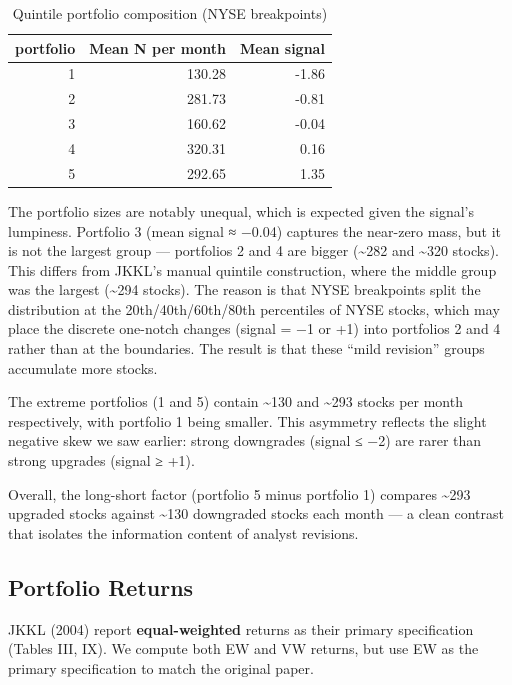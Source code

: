 \documentclass[
  letterpaper,
  DIV=11,
  numbers=noendperiod]{scrartcl}
\begin{document}
\begin{longtable}[t]{rrr}
\caption{\label{tab:portfolio-diagnostics}Quintile portfolio composition (NYSE breakpoints)}\\
\toprule
portfolio & Mean N per month & Mean signal\\
\midrule
1 & 130.28 & -1.86\\
2 & 281.73 & -0.81\\
3 & 160.62 & -0.04\\
4 & 320.31 & 0.16\\
5 & 292.65 & 1.35\\
\bottomrule
\end{longtable}

The portfolio sizes are notably unequal, which is expected given the
signal's lumpiness. Portfolio 3 (mean signal ≈ −0.04) captures the
near-zero mass, but it is not the largest group --- portfolios 2 and 4
are bigger (\textasciitilde282 and \textasciitilde320 stocks). This
differs from JKKL's manual quintile construction, where the middle group
was the largest (\textasciitilde294 stocks). The reason is that NYSE
breakpoints split the distribution at the 20th/40th/60th/80th
percentiles of NYSE stocks, which may place the discrete one-notch
changes (signal = −1 or +1) into portfolios 2 and 4 rather than at the
boundaries. The result is that these ``mild revision'' groups accumulate
more stocks.

The extreme portfolios (1 and 5) contain \textasciitilde130 and
\textasciitilde293 stocks per month respectively, with portfolio 1 being
smaller. This asymmetry reflects the slight negative skew we saw
earlier: strong downgrades (signal ≤ −2) are rarer than strong upgrades
(signal ≥ +1).

Overall, the long-short factor (portfolio 5 minus portfolio 1) compares
\textasciitilde293 upgraded stocks against \textasciitilde130 downgraded
stocks each month --- a clean contrast that isolates the information
content of analyst revisions.

\subsection{Portfolio Returns}\label{portfolio-returns}

JKKL (2004) report \textbf{equal-weighted} returns as their primary
specification (Tables III, IX). We compute both EW and VW returns, but
use EW as the primary specification to match the original paper.
\end{document}
